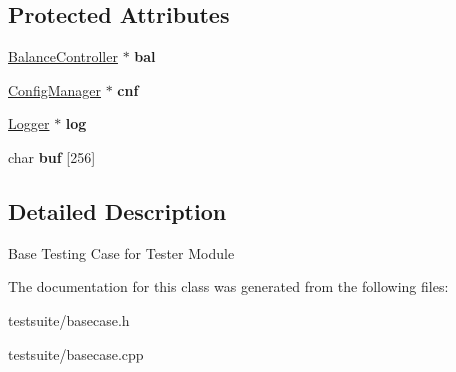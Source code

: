 \subsection*{Protected Attributes}
\begin{DoxyCompactItemize}
\item 
\mbox{\label{classBaseCase_a44426b38567fc61d12e1aae076c35b9e}} 
\mbox{\hyperlink{classBalanceController}{Balance\+Controller}} $\ast$ {\bfseries bal}
\item 
\mbox{\label{classBaseCase_adc80349f0a572c6abbd083211cbcc0b7}} 
\mbox{\hyperlink{classConfigManager}{Config\+Manager}} $\ast$ {\bfseries cnf}
\item 
\mbox{\label{classBaseCase_a0af99c6c9c85ffbb14af5aa0d44a46eb}} 
\mbox{\hyperlink{classLogger}{Logger}} $\ast$ {\bfseries log}
\item 
\mbox{\label{classBaseCase_acc8282ede584f888aaee3a69e24bc1b9}} 
char {\bfseries buf} \mbox{[}256\mbox{]}
\end{DoxyCompactItemize}


\subsection{Detailed Description}
Base Testing Case for Tester Module ~\newline
 

The documentation for this class was generated from the following files\+:\begin{DoxyCompactItemize}
\item 
testsuite/basecase.\+h\item 
testsuite/basecase.\+cpp\end{DoxyCompactItemize}

